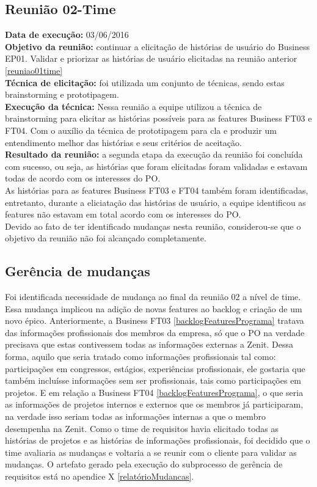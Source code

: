 \subsection{Reunião 02-Time}

 \indent \textbf{Data de execução:} 03/06/2016\\
 \indent \textbf{Objetivo da reunião:} continuar a elicitação de histórias de usuário do Business EP01. Validar e priorizar as histórias de usuário elicitadas na reunião anterior \ref{reuniao01time}\\
 \indent \textbf{Técnica de elicitação:} foi utilizada um conjunto de técnicas, sendo estas brainstorming e prototipagem.\\
 \indent \textbf{Execução da técnica:} Nessa reunião a equipe utilizou a técnica de brainstorming para elicitar as histórias possíveis para as features Business FT03 e FT04. Com o auxílio da técnica de prototipagem para cla e produzir um entendimento melhor das histórias e seus critérios de aceitação.\\

 \indent \textbf{Resultado da reunião:} a segunda etapa da execução da reunião foi concluída com sucesso, ou seja, as histórias que foram elicitadas foram validadas e estavam todas de acordo com os interesses do PO.\\
 As histórias para as features Business FT03 e FT04 também foram identificadas, entretanto, durante a eliciatação das histórias de usuário, a equipe identificou as features não estavam em total acordo com os interesses do PO.\\
 Devido ao fato de ter identificado mudanças nesta reunião, considerou-se que o objetivo da reunião não foi alcançado completamente.\\

\subsection{Gerência de mudanças}

 Foi identificada necessidade de mudança ao final da reunião 02 a nível de time. Essa mudança implicou na adição de novas features ao backlog e criação de um novo épico.
 Anteriormente, a Business FT03 \ref{backlogFeaturesPrograma} tratava das informações profissionais dos membros da empresa, só que o PO na verdade precisava que estas contivessem todas as informações externas a Zenit. Dessa forma, aquilo que seria tratado como informações profissionais tal como: participações em congressos, estágios, experiências profissionais, ele gostaria que também incluísse informações sem ser profissionais, tais como participações em projetos.
 E em relação a Business FT04 \ref{backlogFeaturesPrograma}, o que seria as informações de projetos internos e externos que os membros já participaram, na verdade isso seriam todas as informações internas a que o membro desempenha na Zenit.
 Como o time de requisitos havia elicitado todas as histórias de projetos e as histórias de informações profissionais, foi decidido que o time avaliaria as mudanças e voltaria a se reunir com o cliente para validar as mudanças.
 O artefato gerado pela execução do subprocesso de gerência de requisitos está no apendice X \ref{relatórioMudancas}.

